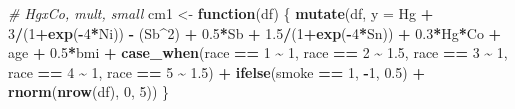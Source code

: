 \documentclass[12pt, twoside]{amherstthesis}
\newenvironment{Shaded}{\begin{snugshade}}{\end{snugshade}}
\newcommand{\AttributeTok}[1]{\textcolor[rgb]{0.13,0.29,0.53}{#1}}
\newcommand{\CommentTok}[1]{\textcolor[rgb]{0.56,0.35,0.01}{\textit{#1}}}
\newcommand{\ControlFlowTok}[1]{\textcolor[rgb]{0.13,0.29,0.53}{\textbf{#1}}}
\newcommand{\DecValTok}[1]{\textcolor[rgb]{0.00,0.00,0.81}{#1}}
\newcommand{\FloatTok}[1]{\textcolor[rgb]{0.00,0.00,0.81}{#1}}
\newcommand{\FunctionTok}[1]{\textcolor[rgb]{0.13,0.29,0.53}{\textbf{#1}}}
\newcommand{\NormalTok}[1]{#1}
\newcommand{\OtherTok}[1]{\textcolor[rgb]{0.56,0.35,0.01}{#1}}
\newcommand{\SpecialCharTok}[1]{\textcolor[rgb]{0.81,0.36,0.00}{\textbf{#1}}}
\begin{document}
\begin{Shaded}
\begin{Highlighting}[]
\CommentTok{\# HgxCo, mult, small}
\NormalTok{cm1 }\OtherTok{\textless{}{-}} \ControlFlowTok{function}\NormalTok{(df) \{}
  \FunctionTok{mutate}\NormalTok{(df, }\AttributeTok{y =} 
\NormalTok{           Hg }\SpecialCharTok{+} \DecValTok{3}\SpecialCharTok{/}\NormalTok{(}\DecValTok{1}\SpecialCharTok{+}\FunctionTok{exp}\NormalTok{(}\SpecialCharTok{{-}}\DecValTok{4}\SpecialCharTok{*}\NormalTok{Ni)) }\SpecialCharTok{{-}}\NormalTok{ (Sb}\SpecialCharTok{\^{}}\DecValTok{2}\NormalTok{) }\SpecialCharTok{+} \FloatTok{0.5}\SpecialCharTok{*}\NormalTok{Sb }\SpecialCharTok{+} \FloatTok{1.5}\SpecialCharTok{/}\NormalTok{(}\DecValTok{1}\SpecialCharTok{+}\FunctionTok{exp}\NormalTok{(}\SpecialCharTok{{-}}\DecValTok{4}\SpecialCharTok{*}\NormalTok{Sn)) }\SpecialCharTok{+} 
           \FloatTok{0.3}\SpecialCharTok{*}\NormalTok{Hg}\SpecialCharTok{*}\NormalTok{Co }\SpecialCharTok{+} 
\NormalTok{           age }\SpecialCharTok{+} \FloatTok{0.5}\SpecialCharTok{*}\NormalTok{bmi }\SpecialCharTok{+} 
           \FunctionTok{case\_when}\NormalTok{(race }\SpecialCharTok{==} \DecValTok{1} \SpecialCharTok{\textasciitilde{}} \DecValTok{1}\NormalTok{, }
\NormalTok{                     race }\SpecialCharTok{==} \DecValTok{2} \SpecialCharTok{\textasciitilde{}} \FloatTok{1.5}\NormalTok{, }
\NormalTok{                     race }\SpecialCharTok{==} \DecValTok{3} \SpecialCharTok{\textasciitilde{}} \DecValTok{1}\NormalTok{, }
\NormalTok{                     race }\SpecialCharTok{==} \DecValTok{4} \SpecialCharTok{\textasciitilde{}} \DecValTok{1}\NormalTok{, }
\NormalTok{                     race }\SpecialCharTok{==} \DecValTok{5} \SpecialCharTok{\textasciitilde{}} \FloatTok{1.5}\NormalTok{) }\SpecialCharTok{+}
           \FunctionTok{ifelse}\NormalTok{(smoke }\SpecialCharTok{==} \DecValTok{1}\NormalTok{, }\SpecialCharTok{{-}}\DecValTok{1}\NormalTok{, }\FloatTok{0.5}\NormalTok{) }\SpecialCharTok{+}
           \FunctionTok{rnorm}\NormalTok{(}\FunctionTok{nrow}\NormalTok{(df), }\DecValTok{0}\NormalTok{, }\DecValTok{5}\NormalTok{))}
\NormalTok{\}}


\end{Highlighting}
\end{Shaded}
\end{document}

